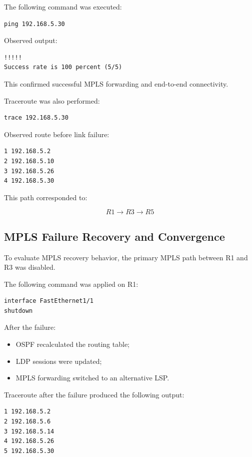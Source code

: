 \documentclass[12pt]{article}
\begin{document}
The following command was executed:

\begin{lstlisting}
ping 192.168.5.30
\end{lstlisting}

Observed output:

\begin{lstlisting}
!!!!!
Success rate is 100 percent (5/5)
\end{lstlisting}

This confirmed successful MPLS forwarding and end-to-end connectivity.

Traceroute was also performed:

\begin{lstlisting}
trace 192.168.5.30
\end{lstlisting}

Observed route before link failure:

\begin{lstlisting}
1 192.168.5.2
2 192.168.5.10
3 192.168.5.26
4 192.168.5.30
\end{lstlisting}

This path corresponded to:

\[
R1 \rightarrow R3 \rightarrow R5
\]

\subsection{MPLS Failure Recovery and Convergence}

To evaluate MPLS recovery behavior, the primary MPLS path between R1 and R3 was disabled.

The following command was applied on R1:

\begin{lstlisting}
interface FastEthernet1/1
shutdown
\end{lstlisting}

After the failure:
\begin{itemize}
    \item OSPF recalculated the routing table;
    \item LDP sessions were updated;
    \item MPLS forwarding switched to an alternative LSP.
\end{itemize}

Traceroute after the failure produced the following output:

\begin{lstlisting}
1 192.168.5.2
2 192.168.5.6
3 192.168.5.14
4 192.168.5.26
5 192.168.5.30
\end{lstlisting}
\end{document}
